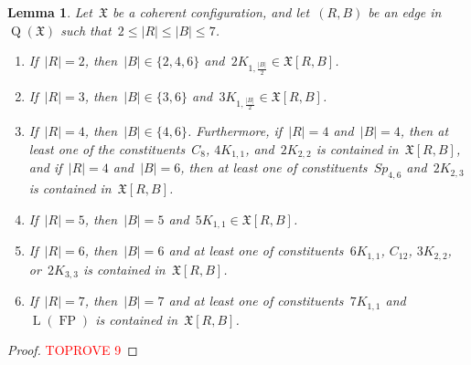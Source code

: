 \documentclass[english,a4paper]{article}
\theoremstyle{plain}
\newtheorem{lemma}      [theorem]{Lemma}
\theoremstyle{definition}
\newcommand{\abs}[1]{| #1 |}
\newcommand{\coherentConfig}{\ensuremath{\mathfrak{X}}}
\newcommand{\interspace}[2]{\ensuremath{\coherentConfig[#1,#2]}}
\DeclareMathOperator*{\Quotient}{Q}
\newcommand{\quotientGraph}[1]{\ensuremath{\Quotient(#1)}}
\newcommand{\clique}[1]{\ensuremath{K_{#1}}}
\newcommand{\cycle}[1]{\ensuremath{C_{#1}}}
\newcommand{\disjointCliques}[2]{\ensuremath{#1 \clique{#2}}}
\DeclareMathOperator{\fanoPlane}{FP}
\DeclareMathOperator{\LeviGraph}{L}
\newcommand{\leviGraph}[1]{\ensuremath{\LeviGraph\!\left(#1\right)}}
\newcommand{\leviFano}{\leviGraph{\fanoPlane}}
\newcommand{\matching}[1]{\ensuremath{#1 K_{1,1}}}
\newcommand{\interspaceFourSix}{\ensuremath{Sp_{4,6}}}
\begin{document}
\begin{lemma}
    \label{small-cc:interspace/lem}
    Let~$\coherentConfig$ be a coherent configuration, and let~$(R,B)$ be an edge in~$\quotientGraph{\coherentConfig}$ such that~$2 \leq \abs{R} \leq \abs{B} \leq 7$.
    \begin{enumerate}[label=(\arabic*)]
        \item If~$\abs{R} = 2$,
        then~$\abs{B} \in \{2,4,6\}$ and~$\disjointCliques{2}{1,\frac{\abs{B}}{2}} \in \interspace{R}{B}$.
        \item If~$\abs{R} = 3$,
        then~$\abs{B} \in \{3,6\}$ and~$\disjointCliques{3}{1,\frac{\abs{B}}{2}} \in \interspace{R}{B}$.
        \item If~$\abs{R} = 4$, then~$\abs{B} \in \{4,6\}$.
        Furthermore, if~$\abs{R} = 4$ and~$\abs{B} = 4$, then at least one of the constituents~$\cycle{8}$, $\matching{4}$, and~$\disjointCliques{2}{2,2}$ is contained in~$\interspace{R}{B}$, and if~$\abs{R} = 4$ and~$\abs{B} = 6$, then at least one of constituents~$\interspaceFourSix$ and~$\disjointCliques{2}{2,3}$ is contained in~$\interspace{R}{B}$.
        \item If~$\abs{R} = 5$,
        then~$\abs{B} = 5$ and~$\matching{5} \in \interspace{R}{B}$.
        \item If~$\abs{R} = 6$,
        then~$\abs{B} = 6$ and at least one of constituents~$\matching{6}$, $\cycle{12}$, $\disjointCliques{3}{2,2}$, or~$\disjointCliques{2}{3,3}$ is contained in~$\interspace{R}{B}$.
        \item If~$\abs{R} = 7$,
        then~$\abs{B} = 7$ and at least one of constituents~$\matching{7}$ and~$\leviFano$ is contained in~$\interspace{R}{B}$.
    \end{enumerate}
\end{lemma}
\begin{proof}\textcolor{red}{TOPROVE 9}\end{proof}
\end{document}
